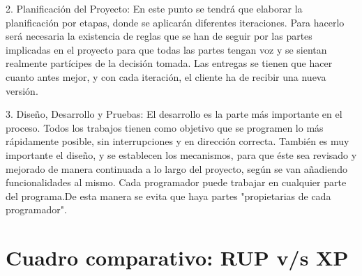 \documentclass{article}
\begin{document}
2. Planificaci\'on del Proyecto: En este punto se tendr\'a que elaborar la planificaci\'on por etapas, donde se aplicar\'an diferentes iteraciones. Para hacerlo ser\'a necesaria la existencia de reglas que se han de seguir por las partes implicadas en el proyecto para que todas las partes tengan voz y se sientan realmente part\'icipes de la decisi\'on tomada.
Las entregas se tienen que hacer cuanto antes mejor, y con cada iteraci\'on, el cliente ha de recibir una nueva versi\'on.

3. Dise\~no, Desarrollo y Pruebas: El desarrollo es la parte m\'as importante en el proceso. Todos los trabajos tienen como objetivo que se programen lo m\'as r\'apidamente posible, sin interrupciones y en direcci\'on correcta.
Tambi\'en es muy importante el dise\~no, y se establecen los mecanismos, para que \'este sea revisado y mejorado de manera continuada a lo largo del proyecto, seg\'un se van a\~nadiendo funcionalidades al mismo. Cada programador puede trabajar en cualquier parte del programa.De esta manera se evita que haya partes "propietarias de cada programador". 

\section{Cuadro comparativo: RUP v/s XP}
\end{document}
